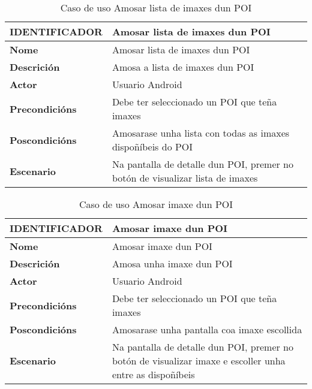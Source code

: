 \begin{table}[tbp]
	\begin{tabular}{|l|p{10cm}|}
		\hline 
		\textbf{IDENTIFICADOR}	& \textbf{Amosar lista de imaxes dun POI} \\ 
		\hline 
		\textbf{Nome} & Amosar lista de imaxes dun POI \\ 
		\hline 
		\textbf{Descrición} & Amosa a lista de imaxes dun POI \\ 
		\hline 
		\textbf{Actor} & Usuario Android \\ 
		\hline 
		\textbf{Precondicións} & Debe ter seleccionado un POI que teña imaxes \\ 
		\hline 
		\textbf{Poscondicións} & Amosarase unha lista con todas as imaxes dispoñíbeis do POI \\ 
		\hline 
		\textbf{Escenario} & Na pantalla de detalle dun POI, premer no botón de visualizar lista de imaxes \\ 
		\hline 
	\end{tabular}
	\caption{Caso de uso Amosar lista de imaxes dun POI}
	\label{tab:cuAmosarListaImaxePOI}
\end{table}

\begin{table}[tbp]
	\begin{tabular}{|l|p{10cm}|}
		\hline 
		\textbf{IDENTIFICADOR}	& \textbf{Amosar imaxe dun POI} \\ 
		\hline 
		\textbf{Nome} & Amosar imaxe dun POI \\ 
		\hline 
		\textbf{Descrición} & Amosa unha imaxe dun POI \\ 
		\hline 
		\textbf{Actor} & Usuario Android \\ 
		\hline 
		\textbf{Precondicións} & Debe ter seleccionado un POI que teña imaxes \\ 
		\hline 
		\textbf{Poscondicións} & Amosarase unha pantalla coa imaxe escollida \\ 
		\hline 
		\textbf{Escenario} & Na pantalla de detalle dun POI, premer no botón de visualizar imaxe e escoller unha entre as dispoñíbeis \\ 
		\hline 
	\end{tabular}
	\caption{Caso de uso Amosar imaxe dun POI}
	\label{tab:cuAmosarImaxePOI}
\end{table}

